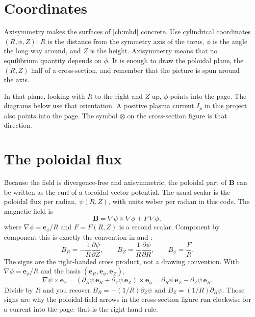 \documentclass[11pt,a4paper,oneside,openany]{book}
\newcommand{\code}{\path}
\numberwithin{equation}{chapter}
\newcommand{\grad}{\nabla}
\newcommand{\Ip}{I_{p}}
\newcommand{\ephi}{\mathbf{e}_{\phi}}
\theoremstyle{definition}
\begin{document}
\section{Coordinates}

Axisymmetry makes the surfaces of \cref{ch:mhd} concrete. Use cylindrical coordinates \((R,\phi,Z)\): \(R\) is the distance from the symmetry axis of the torus, \(\phi\) is the angle the long way around, and \(Z\) is the height. Axisymmetry means that no equilibrium quantity depends on \(\phi\). It is enough to draw the poloidal plane, the \((R,Z)\) half of a cross-section, and remember that the picture is spun around the axis.

In that plane, looking with \(R\) to the right and \(Z\) up, \(\phi\) points into the page. The diagrams below use that orientation. A positive plasma current \(\Ip\) in this project also points into the page. The symbol \(\otimes\) on the cross-section figure is that direction.

\section{The poloidal flux}

Because the field is divergence-free and axisymmetric, the poloidal part of \(\mathbf{B}\) can be written as the curl of a toroidal vector potential. The usual scalar is the poloidal flux per radian, \(\psi(R,Z)\), with units weber per radian in this code. The magnetic field is
\begin{equation}
\label{eq:Brep}
\mathbf{B}=\grad\psi\times\grad\phi+F\,\grad\phi,
\end{equation}
where \(\grad\phi=\ephi/R\) and \(F=F(R,Z)\) is a second scalar. Component by component this is exactly the convention in \code{models/diagnostics.py} and \code{gs/solver.py}:
\begin{equation}
\label{eq:Bcomp}
B_{R}=-\frac{1}{R}\frac{\partial\psi}{\partial Z},
\qquad
B_{Z}=\frac{1}{R}\frac{\partial\psi}{\partial R},
\qquad
B_{\phi}=\frac{F}{R}.
\end{equation}
The signs are the right-handed cross product, not a drawing convention. With \(\grad\phi=\ephi/R\) and the basis \((\mathbf{e}_{R},\ephi,\mathbf{e}_{Z})\),
\[
\grad\psi\times\ephi
=(\partial_{R}\psi\,\mathbf{e}_{R}+\partial_{Z}\psi\,\mathbf{e}_{Z})\times\ephi
=\partial_{R}\psi\,\mathbf{e}_{Z}-\partial_{Z}\psi\,\mathbf{e}_{R}.
\]
Divide by \(R\) and you recover \(B_{R}=-(1/R)\partial_{Z}\psi\) and \(B_{Z}=(1/R)\partial_{R}\psi\). Those signs are why the poloidal-field arrows in the cross-section figure run clockwise for a current into the page: that is the right-hand rule.
\end{document}
